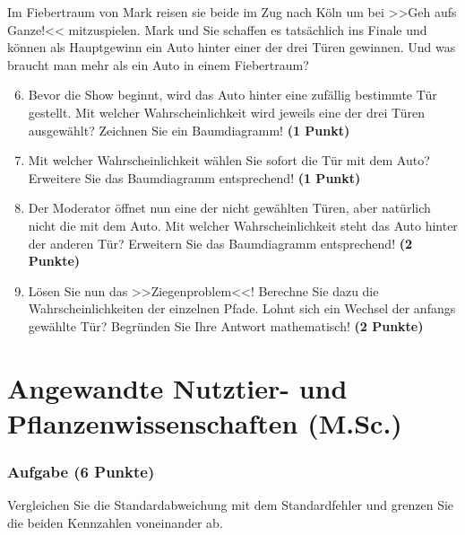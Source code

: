 \documentclass[a4paper, 9pt]{scrartcl}\usepackage[]{graphicx}\usepackage[]{xcolor}
\begin{document}
Im Fiebertraum von Mark reisen sie beide im Zug nach Köln um bei >>Geh aufs Ganze!<< mitzuspielen. Mark und Sie schaffen es tatsächlich ins Finale und können als Hauptgewinn ein Auto hinter einer der drei Türen gewinnen. Und was braucht man mehr als ein Auto in einem Fiebertraum? 

\begin{enumerate}
  \setcounter{enumi}{5}  
\item Bevor die Show beginnt, wird das Auto hinter eine zufällig bestimmte Tür gestellt. Mit welcher Wahrscheinlichkeit wird jeweils eine der drei Türen ausgewählt? Zeichnen Sie ein Baumdiagramm! \textbf{(1 Punkt)}
\item Mit welcher Wahrscheinlichkeit wählen Sie sofort die Tür mit dem Auto? Erweitere Sie das Baumdiagramm entsprechend! \textbf{(1 Punkt)}
\item Der Moderator öffnet nun eine der nicht gewählten Türen, aber natürlich nicht die mit dem Auto. Mit welcher Wahrscheinlichkeit steht das Auto hinter der anderen Tür? Erweitern Sie das Baumdiagramm entsprechend! \textbf{(2 Punkte)}
\item Lösen Sie nun das >>Ziegenproblem<<! Berechne Sie dazu die Wahrscheinlichkeiten der einzelnen Pfade. Lohnt sich ein Wechsel der anfangs gewählte Tür? Begründen Sie Ihre Antwort mathematisch! \textbf{(2 Punkte)}
\end{enumerate}
 






 
\clearpage
\part{Angewandte Nutztier- und Pflanzenwissenschaften (M.Sc.)}

\section{Aufgabe \hfill (6 Punkte)}
Vergleichen Sie die Standardabweichung mit dem Standardfehler und grenzen
Sie die beiden Kennzahlen voneinander ab.
\end{document}
